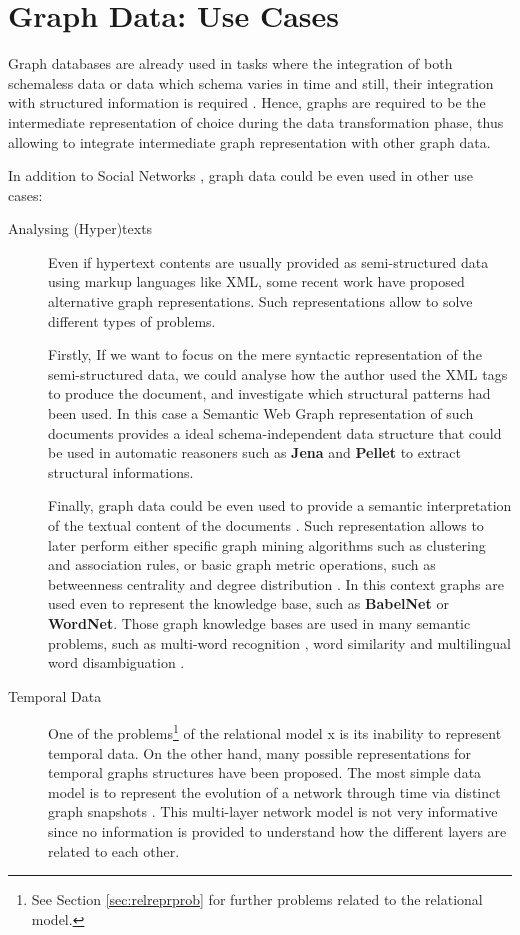 \section{Graph Data: Use Cases}
Graph databases are already used in tasks where the integration of both schemaless data or data which schema varies
in time and still, their integration with structured information is required \cite{Petermann2014,SoussiAZ11}. Hence, graphs are required to be the intermediate
representation of choice during the data transformation phase, thus allowing to
integrate intermediate graph representation with other graph data.

In addition to Social Networks \cite{DMR}, graph data could be even used in other use cases:

\begin{description}
	\item[Analysing (Hyper)texts]
	Even if hypertext contents are usually provided as semi-structured data using markup languages like XML,
	some recent work have proposed alternative graph representations. Such representations allow to solve
	different types of problems.
	\medskip
	
	Firstly, If
	we want to focus on the mere syntactic representation of the semi-structured data, we could analyse how the
	author used the XML tags to produce the document, and investigate which structural patterns had been used.
	In this case a Semantic Web Graph representation of such documents
	\cite{Lassila1999,GutierrezInclusion}
	provides a ideal schema-independent data structure \cite{IorioHierarchy,BarabucciEARMARK} that could be used in automatic reasoners such as \textbf{Jena} \cite{Jena} and \textbf{Pellet} \cite{Pellet} to extract
	structural informations.
	\medskip
	
	Finally, graph data could be even used to provide a semantic interpretation of the textual content
	of the documents \cite{Iglesias}. Such representation allows to later
	perform either specific graph mining algorithms \cite{Samatova} such as clustering and association rules,
	or basic graph metric operations, such as betweenness centrality and degree distribution \cite{Newman}.
	In this context graphs are used even to represent the knowledge base,
	such as \textbf{BabelNet} or \textbf{WordNet}. Those graph knowledge bases are used in many semantic problems, such as
	multi-word recognition \cite{Lossio-Ventura2014}, word similarity \cite{SemSim} and multilingual
	word disambiguation \cite{MultiWordSense}.
	
	\item[Temporal Data] One of the problems\footnote{See Section \vref{sec:relreprprob} for further problems related to the relational model.} of the relational model  x is its inability to represent temporal data.
	On the other hand, many possible representations for temporal graphs structures have been proposed.
	The most simple data model is to represent the evolution of a network through time via distinct graph
	snapshots \cite{AnIntroductionGraph}. This multi-layer network model is
	not very informative since no information is provided to understand how the different layers are related to
	each other.
	

\end{description}

